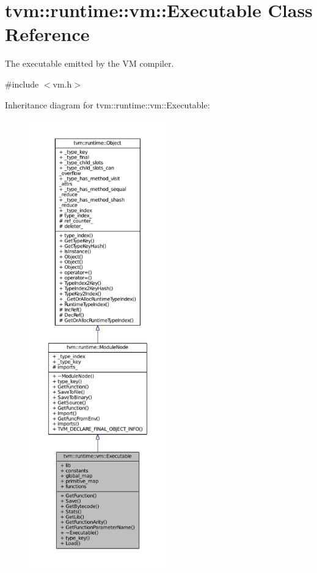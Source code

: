 \hypertarget{classtvm_1_1runtime_1_1vm_1_1Executable}{}\section{tvm\+:\+:runtime\+:\+:vm\+:\+:Executable Class Reference}
\label{classtvm_1_1runtime_1_1vm_1_1Executable}


The executable emitted by the VM compiler.  




{\ttfamily \#include $<$vm.\+h$>$}



Inheritance diagram for tvm\+:\+:runtime\+:\+:vm\+:\+:Executable\+:
\nopagebreak
\begin{figure}[H]
\begin{center}
\leavevmode
\includegraphics[height=550pt]{classtvm_1_1runtime_1_1vm_1_1Executable__inherit__graph}
\end{center}
\end{figure}


